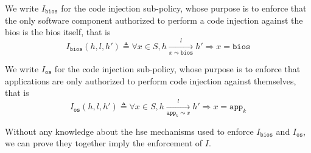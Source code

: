 \begin{definition}
  \label{def:speccert:biospol}

  We write $I_{\mathtt{bios}}$ for the code injection sub-policy, whose purpose
  is to enforce that the only software component authorized to perform a code
  injection against the \ac{bios} is the \ac{bios} itself, that is
  \[
    I_{\mathtt{bios}}(h, l, h') \triangleq \forall x \in S, h \xrightarrow[x
    \leadsto \mathtt{bios}]{l} h' \Rightarrow x = \mathtt{bios}
  \]
\end{definition}

\begin{definition}
  \label{def:speccert:ospol}

  We write $I_{\mathtt{os}}$ for the code injection sub-policy, whose purpose is
  to enforce that applications are only authorized to perform code injection
  against themselves, that is
  \[
    I_\mathtt{os}(h, l, h') \triangleq \forall x \in S, h
    \xrightarrow[\mathtt{app}_k \leadsto x]{l} h' \Rightarrow x = \mathtt{app}_k
  \]
\end{definition}

Without any knowledge about the \ac{hse} mechanisms used to enforce
\( I_{\mathtt{bios}} \) and \( I_{\mathtt{os}} \), we can prove they together
imply the enforcement of \( I \).

